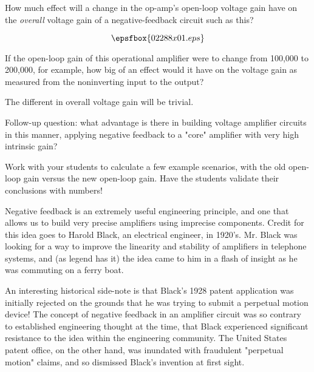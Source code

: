 

How much effect will a change in the op-amp's open-loop voltage gain have on the {\it overall} voltage gain of a negative-feedback circuit such as this?

$$\epsfbox{02288x01.eps}$$

If the open-loop gain of this operational amplifier were to change from 100,000 to 200,000, for example, how big of an effect would it have on the voltage gain as measured from the noninverting input to the output?







The different in overall voltage gain will be trivial.

\vskip 10pt

Follow-up question: what advantage is there in building voltage amplifier circuits in this manner, applying negative feedback to a "core" amplifier with very high intrinsic gain?







Work with your students to calculate a few example scenarios, with the old open-loop gain versus the new open-loop gain.  Have the students validate their conclusions with numbers!

Negative feedback is an extremely useful engineering principle, and one that allows us to build very precise amplifiers using imprecise components.  Credit for this idea goes to Harold Black, an electrical engineer, in 1920's.  Mr. Black was looking for a way to improve the linearity and stability of amplifiers in telephone systems, and (as legend has it) the idea came to him in a flash of insight as he was commuting on a ferry boat.

An interesting historical side-note is that Black's 1928 patent application was initially rejected on the grounds that he was trying to submit a perpetual motion device!  The concept of negative feedback in an amplifier circuit was so contrary to established engineering thought at the time, that Black experienced significant resistance to the idea within the engineering community.  The United States patent office, on the other hand, was inundated with fraudulent "perpetual motion" claims, and so dismissed Black's invention at first sight.




